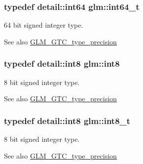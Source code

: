 \subsubsection[{int64\+\_\+t}]{\setlength{\rightskip}{0pt plus 5cm}typedef detail\+::int64 {\bf glm\+::int64\+\_\+t}}\label{group__gtc__type__precision_ga6abb23fbf4e39c50ec5341160b5da5ab}
64 bit signed integer type. \begin{DoxySeeAlso}{See also}
\hyperlink{group__gtc__type__precision}{G\+L\+M\+\_\+\+G\+T\+C\+\_\+type\+\_\+precision} 
\end{DoxySeeAlso}
\hypertarget{group__gtc__type__precision_ga96254f9c1c4506fc8eb5cf3301ce8565}{}
\subsubsection[{int8}]{\setlength{\rightskip}{0pt plus 5cm}typedef detail\+::int8 {\bf glm\+::int8}}\label{group__gtc__type__precision_ga96254f9c1c4506fc8eb5cf3301ce8565}
8 bit signed integer type. \begin{DoxySeeAlso}{See also}
\hyperlink{group__gtc__type__precision}{G\+L\+M\+\_\+\+G\+T\+C\+\_\+type\+\_\+precision} 
\end{DoxySeeAlso}
\hypertarget{group__gtc__type__precision_ga673898d450b2a91186f3c4f40c5f8633}{}
\subsubsection[{int8\+\_\+t}]{\setlength{\rightskip}{0pt plus 5cm}typedef detail\+::int8 {\bf glm\+::int8\+\_\+t}}\label{group__gtc__type__precision_ga673898d450b2a91186f3c4f40c5f8633}
8 bit signed integer type. \begin{DoxySeeAlso}{See also}
\hyperlink{group__gtc__type__precision}{G\+L\+M\+\_\+\+G\+T\+C\+\_\+type\+\_\+precision} 
\end{DoxySeeAlso}
\hypertarget{group__gtc__type__precision_gaf7bbfd31bcec25a416ea94d09efb5451}{}
